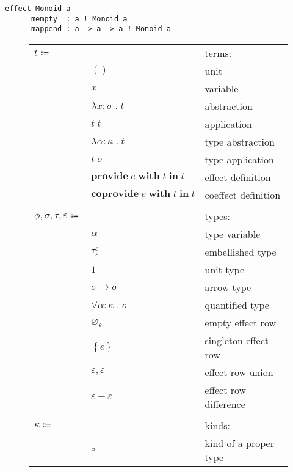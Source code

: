 \documentclass[12pt]{article}
\newcommand\anno[2]{#1 : #2}
\newcommand\term{t}
\newcommand\eunit{()}
\newcommand\evar{x}
\newcommand\eabs[2]{\lambda #1 \; . \; #2}
\newcommand\eapp[2]{#1 \; #2}
\newcommand\etabs[2]{\lambda #1 \; . \; #2}
\newcommand\etapp[2]{#1 \; #2}
\newcommand\eprovide[3]{\textbf{provide} \; #1 \; \textbf{with} \; #2 \; \textbf{in} \; #3}
\newcommand\ecoprovide[3]{\textbf{coprovide} \; #1 \; \textbf{with} \; #2 \; \textbf{in} \; #3}
\newcommand\type{\phi}
\newcommand\proper{\tau}
\newcommand\row{\varepsilon}
\newcommand\embellished{\sigma}
\newcommand\tvar{\alpha}
\newcommand\tembellished[3]{{#1}^{#2}_{#3}}
\newcommand\tunit{1}
\newcommand\tarrow[2]{#1 \rightarrow #2}
\newcommand\tforall[2]{\forall #1 \; . \; #2}
\newcommand\tempty{\varnothing_{\row}}
\newcommand\tsingleton[1]{\left\{ #1 \right\}}
\newcommand\tunion[2]{#1, #2}
\newcommand\tdiff[2]{#1 - #2}
\newcommand\kind{\kappa}
\newcommand\kproper{\circ}
\newcommand\effect{e}
\begin{document}
  \begin{lstlisting}[gobble=4]
    effect Monoid a
      mempty  : a ! Monoid a
      mappend : a -> a -> a ! Monoid a
  \end{lstlisting}

  \begin{figure}
    \begin{mdframed}[backgroundcolor=none]
      \begin{center}
        \begin{tabular}{l l l}
          $\term \Coloneqq $ & & terms: \\
          & $\eunit$ & unit \\
          & $\evar$ & variable \\
          & $\eabs{\anno{\evar}{\embellished}}{\term}$ & abstraction \\
          & $\eapp{\term}{\term}$ & application \\
          & $\etabs{\anno{\tvar}{\kind}}{\term}$ & type abstraction \\
          & $\etapp{\term}{\embellished}$ & type application \\
          & $\eprovide{\effect}{\term}{\term}$ & effect definition \\
          & $\ecoprovide{\effect}{\term}{\term}$ & coeffect definition \\
          \\
          $\type,\embellished, \proper, \row \Coloneqq$ & & types: \\
          & $\tvar$ & type variable \\
          & $\tembellished{\proper}{\row}{\row}$ & embellished type \\
          & $\tunit$ & unit type \\
          & $\tarrow{\embellished}{\embellished}$ & arrow type \\
          & $\tforall{\anno{\tvar}{\kind}}{\embellished}$ & quantified type \\
          & $\tempty$ & empty effect row \\
          & $\tsingleton{\effect}$ & singleton effect row \\
          & $\tunion{\row}{\row}$ & effect row union \\
          & $\tdiff{\row}{\row}$ & effect row difference \\
          \\
          $\kind \Coloneqq$ & & kinds: \\
          & $\kproper$ & kind of a proper type \\

\end{tabular}
\end{center}
\end{mdframed}
\end{figure}
\end{document}
